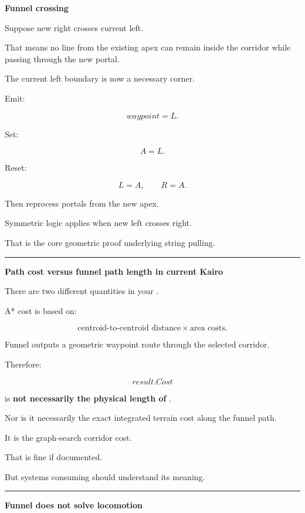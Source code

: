 \textbf{Funnel crossing}

Suppose new right crosses current left.

That means no line from the existing apex can remain inside the corridor while passing through the new portal.

The current left boundary is now a necessary corner.

Emit:

\[
waypoint=L.
\]

Set:

\[
A=L.
\]

Reset:

\[
L=A,
\qquad
R=A.
\]

Then reprocess portals from the new apex.

Symmetric logic applies when new left crosses right.

That is the core geometric proof underlying string pulling.

\begin{center}\rule{0.5\linewidth}{0.5pt}\end{center}

\textbf{Path cost versus funnel path length in current Kairo}

There are two different quantities in your .

A* cost is based on:

\[
\text{centroid-to-centroid distance}
\times
\text{area costs}.
\]

Funnel outputs a geometric waypoint route through the selected corridor.

Therefore:

\[
result.Cost
\]

is \textbf{not necessarily the physical length of }.

Nor is it necessarily the exact integrated terrain cost along the funnel path.

It is the graph-search corridor cost.

That is fine if documented.

But systems consuming  should understand its meaning.

\begin{center}\rule{0.5\linewidth}{0.5pt}\end{center}

\textbf{Funnel does not solve locomotion}

